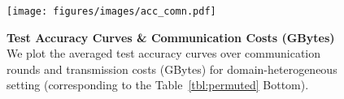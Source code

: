 \begin{figure}[t]
\small
\centering
\vspace{-0.05in}
\texttt{[image: figures/images/acc\_comn.pdf]} 
\caption{\small{\textbf{Test Accuracy Curves \& Communication Costs (GBytes)}} We plot the averaged test accuracy curves over communication rounds and transmission costs (GBytes) for domain-heterogeneous setting (corresponding to the Table~\ref{tbl:permuted} Bottom). }
\label{fig:acc_plot}
\vspace{-0.25in}
\end{figure}
